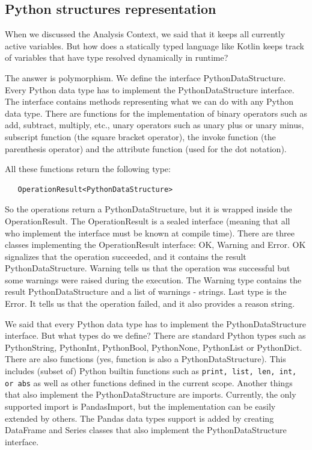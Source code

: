 \subsection{Python structures representation}

When we discussed the Analysis Context, we said that it keeps all currently active variables.
But how does a statically typed language like Kotlin keeps track of variables that have type resolved dynamically in
runtime?

The answer is polymorphism.
We define the interface PythonDataStructure.
Every Python data type has to implement the PythonDataStructure interface.
The interface contains methods representing what we can do with any Python data type.
There are functions for the implementation of binary operators such as add, subtract, multiply, etc., unary operators
such as unary plus or unary minus, subscript function (the square bracket operator), the invoke function
(the parenthesis operator) and the attribute function (used for the dot notation).

All these functions return the following type:
\begin{verbatim}
   OperationResult<PythonDataStructure>
\end{verbatim}
So the operations return a PythonDataStructure, but it is wrapped inside the OperationResult.
The OperationResult is a sealed interface (meaning that all who implement the interface must be known at compile time).
There are three classes implementing the OperationResult interface: OK, Warning and Error.
OK signalizes that the operation succeeded, and it contains the result PythonDataStructure.
Warning tells us that the operation was successful but some warnings were raised during the execution.
The Warning type contains the result PythonDataStructure and a list of warnings - strings.
Last type is the Error.
It tells us that the operation failed, and it also provides a reason string.

We said that every Python data type has to implement the PythonDataStructure interface.
But what types do we define?
There are standard Python types such as PythonString, PythonInt, PythonBool, PythonNone, PythonList or PythonDict.
There are also functions (yes, function is also a PythonDataStructure).
This includes (subset of) Python builtin
functions such as \verb|print, list, len, int, or abs| as well as other functions defined in the current scope.
Another things that also implement the PythonDataStructure are imports.
Currently, the only supported import is PandasImport, but the implementation can be easily extended by others.
The Pandas data types support is added by creating DataFrame and Series classes that also implement the PythonDataStructure
interface.


